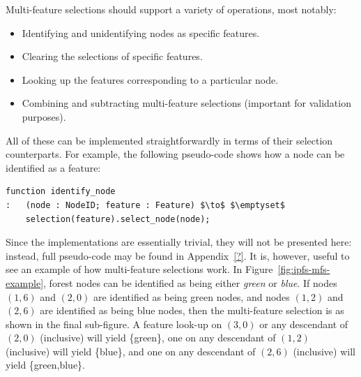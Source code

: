 \noindent Multi-feature selections should support a variety of operations, most notably:

\begin{itemize}
\item Identifying and unidentifying nodes as specific features.
\item Clearing the selections of specific features.
\item Looking up the features corresponding to a particular node.
\item Combining and subtracting multi-feature selections (important for validation purposes).
\end{itemize}

\noindent All of these can be implemented straightforwardly in terms of their selection counterparts. For example, the following pseudo-code shows how a node can be identified as a feature:

\begin{lstlisting}[style=Default]
function identify_node
:	(node : NodeID; feature : Feature) $\to$ $\emptyset$
	selection(feature).select_node(node);
\end{lstlisting}

\noindent Since the implementations are essentially trivial, they will not be presented here: instead, full pseudo-code may be found in Appendix~\ref{?}. It is, however, useful to see an example of how multi-feature selections work. In Figure~\ref{fig:ipfs-mfs-example}, forest nodes can be identified as being either \emph{green} or \emph{blue}. If nodes $(1,6)$ and $(2,0)$ are identified as being green nodes, and nodes $(1,2)$ and $(2,6)$ are identified as being blue nodes, then the multi-feature selection is as shown in the final sub-figure. A feature look-up on $(3,0)$ or any descendant of $(2,0)$ (inclusive) will yield \{green\}, one on any descendant of $(1,2)$ (inclusive) will yield \{blue\}, and one on any descendant of $(2,6)$ (inclusive) will yield \{green,blue\}.

